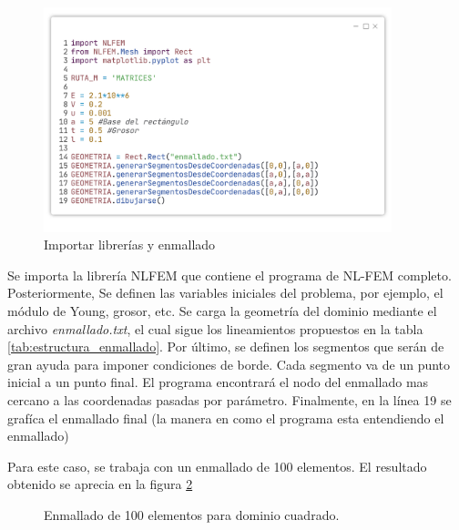 \begin{enumerate}
		\begin{figure}
			\centering
			\sffamily
			\includegraphics[width=0.9\textwidth]{figuras/placa_c1.pdf}
			\caption{Importar librerías y enmallado}
			\label{fig:imports_placa}
		\end{figure}
		Se importa la librería NLFEM que contiene el programa de NL-FEM completo. Posteriormente, Se definen las variables iniciales del problema, por ejemplo, el módulo de Young, grosor, etc. Se carga la geometría del dominio mediante el archivo \textit{enmallado.txt}, el cual sigue los lineamientos propuestos en la tabla \ref{tab:estructura_enmallado}. Por último, se definen los segmentos que serán de gran ayuda para imponer condiciones de borde. Cada segmento va de un punto inicial a un punto final. El programa encontrará el nodo del enmallado mas cercano a las coordenadas pasadas por parámetro. Finalmente, en la línea 19 se grafíca el enmallado final (la manera en como el programa esta entendiendo el enmallado)

		Para este caso, se trabaja con un enmallado de 100 elementos. El resultado obtenido se aprecia en la figura \ref{fig:enmallado1010placa}

		\begin{figure}
			\centering
			\sffamily
			\caption{Enmallado de 100 elementos para dominio cuadrado.}
			\label{fig:enmallado1010placa}
		\end{figure}


\end{enumerate}
